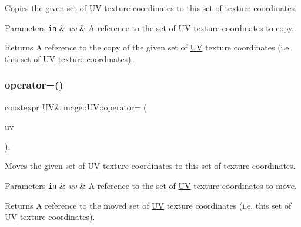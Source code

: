 Copies the given set of \hyperlink{structmage_1_1_u_v}{UV} texture coordinates to this set of texture coordinates.


\begin{DoxyParams}[1]{Parameters}
\mbox{\tt in}  & {\em uv} & A reference to the set of \hyperlink{structmage_1_1_u_v}{UV} texture coordinates to copy. \\
\hline
\end{DoxyParams}
\begin{DoxyReturn}{Returns}
A reference to the copy of the given set of \hyperlink{structmage_1_1_u_v}{UV} texture coordinates (i.\+e. this set of \hyperlink{structmage_1_1_u_v}{UV} texture coordinates). 
\end{DoxyReturn}
\hypertarget{structmage_1_1_u_v_a2737f10decab84904fbd16a3f213c470}{}\label{structmage_1_1_u_v_a2737f10decab84904fbd16a3f213c470} 
\subsubsection{\texorpdfstring{operator=()}{operator=()}\hspace{0.1cm}{\footnotesize\ttfamily [2/2]}}
{\footnotesize\ttfamily constexpr \hyperlink{structmage_1_1_u_v}{UV}\& mage\+::\+U\+V\+::operator= (\begin{DoxyParamCaption}\item[{\hyperlink{structmage_1_1_u_v}{UV} \&\&}]{uv }\end{DoxyParamCaption})\hspace{0.3cm}{\ttfamily [default]}, {\ttfamily [noexcept]}}

Moves the given set of \hyperlink{structmage_1_1_u_v}{UV} texture coordinates to this set of texture coordinates.


\begin{DoxyParams}[1]{Parameters}
\mbox{\tt in}  & {\em uv} & A reference to the set of \hyperlink{structmage_1_1_u_v}{UV} texture coordinates to move. \\
\hline
\end{DoxyParams}
\begin{DoxyReturn}{Returns}
A reference to the moved set of \hyperlink{structmage_1_1_u_v}{UV} texture coordinates (i.\+e. this set of \hyperlink{structmage_1_1_u_v}{UV} texture coordinates). 
\end{DoxyReturn}

